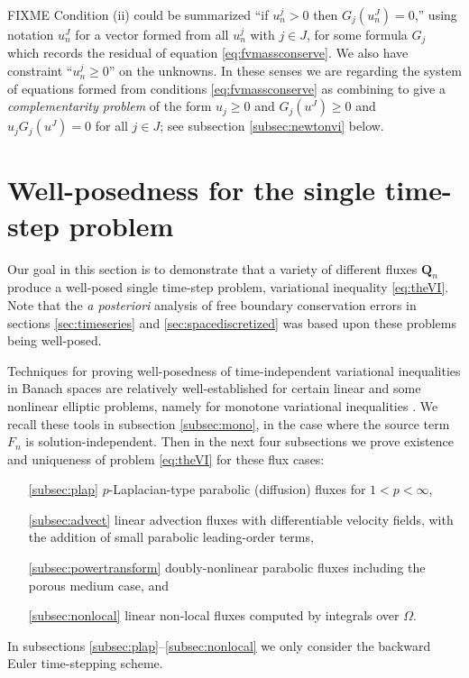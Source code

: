 \documentclass[final,leqno,onefignum,onetabnum]{siamltex1213bueler}
\newcommand\bQ{\mathbf{Q}}
\begin{document}
FIXME Condition (ii) could be summarized ``if $u_n^j>0$ then $G_j(u_n^J)=0$,'' using notation $u_n^J$ for a vector formed from all $u_n^j$ with $j\in J$, for some formula $G_j$ which records the residual of equation \eqref{eq:fvmassconserve}.  We also have constraint ``$u_n^j\ge 0$'' on the unknowns.  In these senses we are regarding the system of equations formed from conditions \eqref{eq:fvmassconserve} as combining to give a \emph{complementarity problem} \cite{BillupsMurty2000} of the form $u_j\ge 0$ and $G_j(u^J)\ge 0$ and $u_j G_j(u^J)=0$ for all $j\in J$; see subsection \ref{subsec:newtonvi} below.


\section{Well-posedness for the single time-step problem} \label{sec:wellposed}

Our goal in this section is to demonstrate that a variety of different fluxes $\bQ_n$ produce a well-posed single time-step problem, variational inequality \eqref{eq:theVI}.  Note that the \emph{a posteriori} analysis of free boundary conservation errors in sections \ref{sec:timeseries} and \ref{sec:spacediscretized} was based upon these problems being well-posed.

Techniques for proving well-posedness of time-independent variational inequalities in Banach spaces are relatively well-established for certain linear and some nonlinear elliptic problems, namely for monotone variational inequalities \cite{KinderlehrerStampacchia1980}.  We recall these tools in subsection \ref{subsec:mono}, in the case where the source term $F_n$ is solution-independent.  Then in the next four subsections we prove existence and uniqueness of problem \eqref{eq:theVI} for these flux cases:
\begin{itemize}
\item[\ref{subsec:plap}] $p$-Laplacian-type parabolic (diffusion) fluxes for $1<p<\infty$,
\item[\ref{subsec:advect}] linear advection fluxes with differentiable velocity fields, with the addition of small parabolic leading-order terms,
\item[\ref{subsec:powertransform}] doubly-nonlinear parabolic fluxes including the porous medium case, and
\item[\ref{subsec:nonlocal}] linear non-local fluxes computed by integrals over $\Omega$.
\end{itemize}
In subsections \ref{subsec:plap}--\ref{subsec:nonlocal} we only consider the backward Euler time-stepping scheme.
\end{document}
